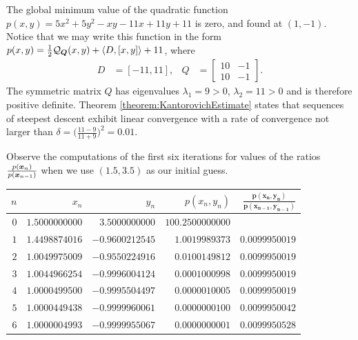 \begin{example}\label{example:SDconvergenceRate}
The global minimum value of the quadratic function $p(x,y) = 5x^2 + 5y^2 -xy -11x +11y +11$ is zero, and found at $(1,-1)$.  Notice that we may write this function in the form $p(x,y) = \tfrac{1}{2}\mathcal{Q}_{\boldsymbol{Q}}(x,y) + \langle D, [x,y] \rangle + 11$, where
\begin{align*}
D &= [ -11, 11], & Q &= \begin{bmatrix} 10 & -1 \\ 10 & -1 \end{bmatrix}.
\end{align*}
The symmetric matrix $Q$ has eigenvalues $\lambda_1 = 9 >0$, $\lambda_2 = 11 > 0$ and is therefore positive definite.  Theorem \ref{theorem:KantorovichEstimate} states that sequences of steepest descent exhibit linear convergence with a rate of convergence not larger than $\delta = \big( \tfrac{11-9}{11+9} \big)^2 = 0.01$.

Observe the computations of the first six iterations for values of the ratios $\frac{p(\boldsymbol{x}_n)}{p(\boldsymbol{x}_{n-1})}$ when we use $(1.5,3.5)$ as our initial guess.
\begin{center}
\begin{tabular}{|r|r|r|r|r|} \hline 
 $n$ & $x_n$ & $y_n$ & $p(x_n,y_n)$ & $\boldsymbol{\frac{p(x_n,y_n)}{p(x_{n-1},y_{n-1})}}$ \\ \hline \hline 
$0$ & $1.5000000000$ & $3.5000000000$ & $100.2500000000$ &  \\ \hline 
$1$ & $1.4498874016$ & $-0.9600212545$ & $1.0019989373$ & $\boldsymbol{0.0099950019}$ \\ \hline 
$2$ & $1.0049975009$ & $-0.9550224916$ & $0.0100149812$ & $\boldsymbol{0.0099950019}$ \\ \hline 
$3$ & $1.0044966254$ & $-0.9996004124$ & $0.0001000998$ & $\boldsymbol{0.0099950019}$ \\ \hline 
$4$ & $1.0000499500$ & $-0.9995504497$ & $0.0000010005$ & $\boldsymbol{0.0099950019}$ \\ \hline 
$5$ & $1.0000449438$ & $-0.9999960061$ & $0.0000000100$ & $\boldsymbol{0.0099950042}$ \\ \hline 
$6$ & $1.0000004993$ & $-0.9999955067$ & $0.0000000001$ & $\boldsymbol{0.0099950528}$ \\ \hline 
\end{tabular}
\end{center}
\end{example}
